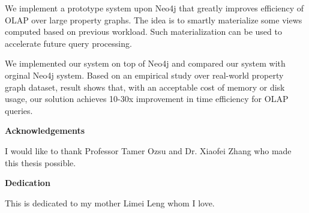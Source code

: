 We implement a prototype system upon Neo4j that greatly improves efficiency of OLAP over large property graphs. The idea is to smartly materialize some views computed based on previous workload. Such materialization can be used to accelerate future query processing.  

We implemented our system on top of Neo4j and compared our system with orginal Neo4j system. Based on an empirical study over real-world property graph dataset, result shows that, with an acceptable cost of memory or disk usage, our solution achieves 10-30x improvement in time efficiency for OLAP queries.  

\cleardoublepage


\begin{center}\textbf{Acknowledgements}\end{center}

I would like to thank Professor Tamer Ozsu and Dr. Xiaofei Zhang who made this thesis possible.
\cleardoublepage


\begin{center}\textbf{Dedication}\end{center}

This is dedicated to my mother Limei Leng whom I love.
\cleardoublepage

\renewcommand\contentsname{Table of Contents}
\tableofcontents
\cleardoublepage
{}    %

\listoftables
\cleardoublepage
{}		%

\listoffigures
\cleardoublepage
{}		%

\printglossaries
\cleardoublepage
{}		%


